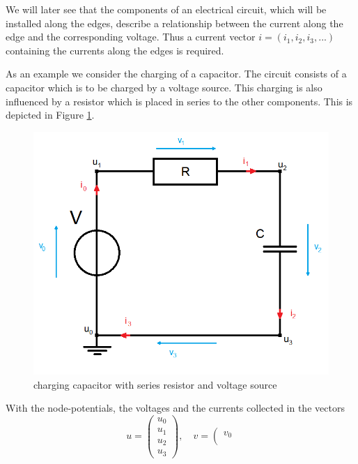 We will later see that the components of an electrical circuit, which will be installed along the edges, describe a relationship between the current along the edge and the corresponding voltage. Thus a current vector $i = (i_1, i_2, i_3, ...)$ containing the currents along the edges is required.


\begin{example1}
	\label{ex:network topology}
	As an example we consider the charging of a capacitor. The circuit consists of a capacitor which is to be charged by a voltage source. This charging is also influenced by a resistor which is placed in series to the other components. This is depicted in Figure \ref{circuit:charging of capacitor}.
	\begin{figure}[H]
		\centering
		\includegraphics[scale=0.5]{pictures/Example1_simple.png}
		\caption{charging capacitor with series resistor and voltage source}
		\label{circuit:charging of capacitor}
	\end{figure}
	With the node-potentials, the voltages and the currents collected in the vectors
	\begin{displaymath}
		u=
		\left(
		\begin{matrix}
			u_0 \\
			u_1 \\
			u_2 \\
			u_3 
		\end{matrix}
		\right),
		\quad
		v=
		\left(
		\begin{matrix}
			v_0 \\

\end{matrix}
\end{displaymath}
\end{example1}

